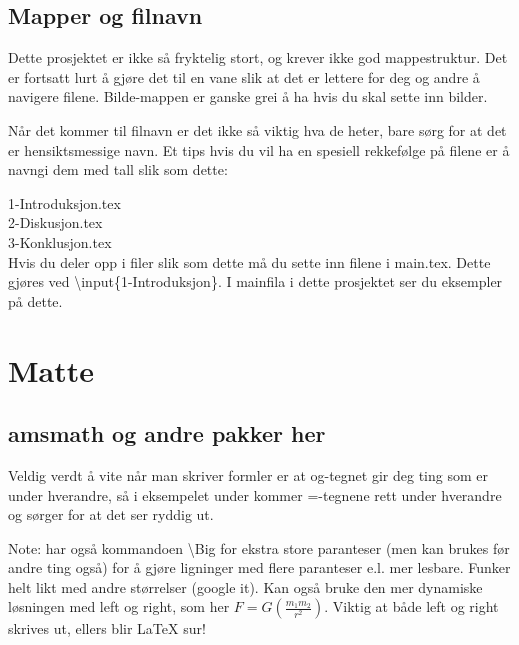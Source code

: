     \subsection{Mapper og filnavn}
        Dette prosjektet er ikke så fryktelig stort, og krever ikke god mappestruktur. Det er fortsatt lurt å gjøre det til en vane slik at det er lettere for deg og andre å navigere filene. Bilde-mappen er ganske grei å ha hvis du skal sette inn bilder.
        
        Når det kommer til filnavn er det ikke så viktig hva de heter, bare sørg for at det er hensiktsmessige navn. Et tips hvis du vil ha en spesiell rekkefølge på filene er å navngi dem med tall slik som dette:
        
        1-Introduksjon.tex\\
        2-Diskusjon.tex\\
        3-Konklusjon.tex\\
        
        Hvis du deler opp i filer slik som dette må du sette inn filene i main.tex. Dette gjøres ved \textbackslash input\{1-Introduksjon\}. I mainfila i dette prosjektet ser du eksempler på dette.
        
    
\section{Matte}
    \subsection{amsmath og andre pakker her}


        Veldig verdt å vite når man skriver formler er at og-tegnet gir deg ting som er under hverandre, så i eksempelet under kommer =-tegnene rett under hverandre og sørger for at det ser ryddig ut. 

        Note: har også kommandoen \textbackslash Big for ekstra store paranteser (men kan brukes før andre ting også) for å gjøre ligninger med flere paranteser e.l. mer lesbare. Funker helt likt med andre størrelser (google it). Kan også bruke den mer dynamiske løsningen med left og right, som her \(F = G \left(  \frac{m_1 m_2}{r^2} \right)\). Viktig at både left og right skrives ut, ellers blir \LaTeX{} sur!

